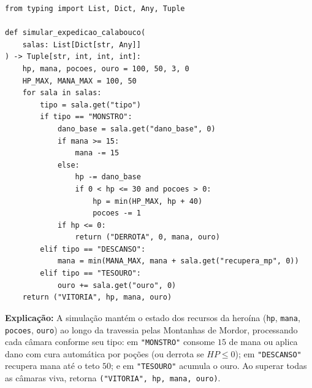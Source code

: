 \ifmostrarGabarito
\clearpage
\begin{verbatim}
from typing import List, Dict, Any, Tuple

def simular_expedicao_calabouco(
    salas: List[Dict[str, Any]]
) -> Tuple[str, int, int, int]:
    hp, mana, pocoes, ouro = 100, 50, 3, 0
    HP_MAX, MANA_MAX = 100, 50
    for sala in salas:
        tipo = sala.get("tipo")
        if tipo == "MONSTRO":
            dano_base = sala.get("dano_base", 0)
            if mana >= 15:
                mana -= 15
            else:
                hp -= dano_base
                if 0 < hp <= 30 and pocoes > 0:
                    hp = min(HP_MAX, hp + 40)
                    pocoes -= 1
            if hp <= 0:
                return ("DERROTA", 0, mana, ouro)
        elif tipo == "DESCANSO":
            mana = min(MANA_MAX, mana + sala.get("recupera_mp", 0))
        elif tipo == "TESOURO":
            ouro += sala.get("ouro", 0)
    return ("VITORIA", hp, mana, ouro)
\end{verbatim}

\textbf{Explicação:}
A simulação mantém o estado dos recursos da heroína (\texttt{hp}, \texttt{mana}, \texttt{pocoes}, \texttt{ouro}) ao longo da travessia pelas Montanhas de Mordor, processando cada câmara conforme seu tipo: em \texttt{"MONSTRO"} consome $15$ de mana ou aplica dano com cura automática por poções (ou derrota se $HP \le 0$); em \texttt{"DESCANSO"} recupera mana até o teto $50$; e em \texttt{"TESOURO"} acumula o ouro. Ao superar todas as câmaras viva, retorna \texttt{("VITORIA", hp, mana, ouro)}.

